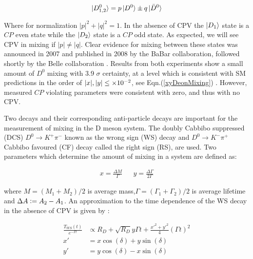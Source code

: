 \begin{equation}\label{DeonLinComb}
\ket{D^{0}_{1,2}} = p \ket{D^{0}} \pm q \ket{\bar{D}^{0}}
\end{equation}

\noindent Where for normalization $|p|^{2}+|q|^{2} = 1$. In the absence of CPV the $\ket{D_{1}}$ state is a $CP$ even state while the $\ket{D_{2}}$ state is a $CP$ odd state. As expected, we will see CPV in mixing if $|p| \neq |q|$. Clear evidence for mixing between these states was announced in 2007 and published in 2008 by the BaBar collaboration, followed shortly by the Belle collaboration \cite{BabarD0mixing}\cite{BelleD0mixing}. Results from both experiments show a small amount of $D^{0}$ mixing with 3.9 $\sigma$ certainty, at a level which is consistent with SM predictions in the order of $|x|,|y| \leq \times 10^{-2}$, see Eqn.(\ref{xyDeonMixing}) \cite{Babar_D0_Review}. However, measured $CP$ violating parameters were consistent with zero, and thus with no CPV.

Two decays and their corresponding anti-particle decays are important for the measurement of mixing in the D meson system. The doubly Cabbibo suppressed (DCS) $D^{0} \rightarrow K^{+} \pi^{-}$ known as the wrong sign (WS) decay and $D^{0} \rightarrow K^{-} \pi^{+}$ Cabbibo favoured (CF) decay called the right sign (RS), are used. Two parameters which determine the amount of mixing in a system are defined as:

\begin{align}\label{xyDeonMixing}
x = \frac{\Delta M}{\Gamma} & & y = \frac{\Delta \Gamma}{2 \Gamma}
\end{align}

\noindent where $M= (M_{1}+M_{2})/2$ is average mass,$\Gamma = (\Gamma_{1}+\Gamma_{2})/2$ is average lifetime and $\Delta A \vcentcolon= A_{2} - A_{1}$. An approximation to the time dependence of the WS decay in the absence of CPV is given by \cite{BabarD0mixing}:

\begin{align*}
\frac{T_{WS}(t)}{e^{-\Gamma t}} & \propto R_{D} + \sqrt{R_{D}} y \Gamma t + \frac{{x'}^2 + {y'}^2}{4} (\Gamma t)^{2} \\
                             x' & = x \cos (\delta) + y \sin (\delta)\\
                             y' & = y \cos (\delta) - x \sin (\delta)
\end{align*}

